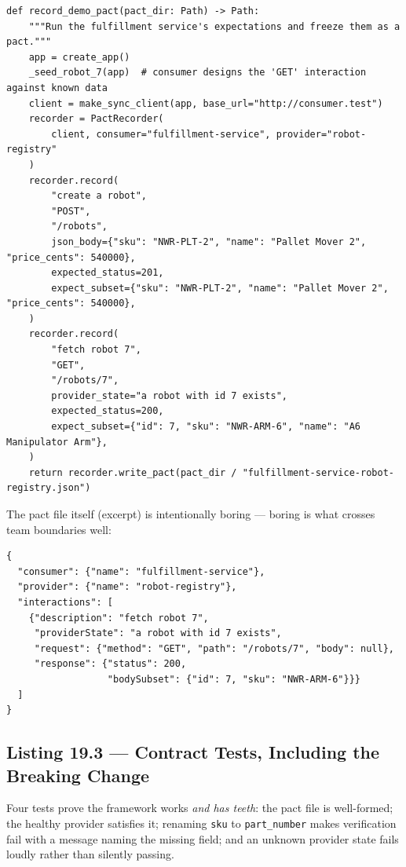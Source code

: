 \begin{verbatim}
def record_demo_pact(pact_dir: Path) -> Path:
    """Run the fulfillment service's expectations and freeze them as a pact."""
    app = create_app()
    _seed_robot_7(app)  # consumer designs the 'GET' interaction against known data
    client = make_sync_client(app, base_url="http://consumer.test")
    recorder = PactRecorder(
        client, consumer="fulfillment-service", provider="robot-registry"
    )
    recorder.record(
        "create a robot",
        "POST",
        "/robots",
        json_body={"sku": "NWR-PLT-2", "name": "Pallet Mover 2", "price_cents": 540000},
        expected_status=201,
        expect_subset={"sku": "NWR-PLT-2", "name": "Pallet Mover 2", "price_cents": 540000},
    )
    recorder.record(
        "fetch robot 7",
        "GET",
        "/robots/7",
        provider_state="a robot with id 7 exists",
        expected_status=200,
        expect_subset={"id": 7, "sku": "NWR-ARM-6", "name": "A6 Manipulator Arm"},
    )
    return recorder.write_pact(pact_dir / "fulfillment-service-robot-registry.json")
\end{verbatim}

The pact file itself (excerpt) is intentionally boring --- boring is what
crosses team boundaries well:

\begin{verbatim}
{
  "consumer": {"name": "fulfillment-service"},
  "provider": {"name": "robot-registry"},
  "interactions": [
    {"description": "fetch robot 7",
     "providerState": "a robot with id 7 exists",
     "request": {"method": "GET", "path": "/robots/7", "body": null},
     "response": {"status": 200,
                  "bodySubset": {"id": 7, "sku": "NWR-ARM-6"}}}
  ]
}
\end{verbatim}

\subsection{Listing 19.3 --- Contract Tests, Including the Breaking Change}
\label{sec:ch19-listing-pact-tests}

Four tests prove the framework works \emph{and has teeth}: the pact file is
well-formed; the healthy provider satisfies it; renaming \texttt{sku} to
\texttt{part\_number} makes verification fail with a message naming the
missing field; and an unknown provider state fails loudly rather than
silently passing.

